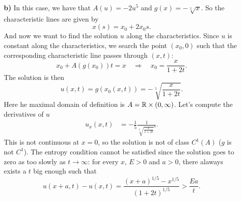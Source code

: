 \begin{enumerate}
    \item[\textbf{b)}]
          In this case, we have that \(A(u) = -2u^5\) and \(g(x) = -\sqrt[5]{x}\). So the characteristic lines are given by
          \[
              x(s) = x_0 + 2 x_0 s.
          \]
          And now we want to find the solution \(u\) along the characteristics. Since
          \(u\) is constant along the characteristics, we search the point \((x_0, 0)\)
          such that the corresponding characteristic line passes through \((x, t)\):
          \[
              x_0 + A(g(x_0)) t = x \quad \Rightarrow \quad x_0 = \frac{x}{1+2t}.
          \]
          The solution is then
          \[
              u(x,t) = g(x_0(x,t)) = -\sqrt[5]{\frac{x}{1+2t}}.
          \]
          Here he maximal domain of definition is \(A = \mathbb{R} \times (0, \infty)\). Let's
          compute the derivatives of \(u\)
          \begin{align*}
              u_x(x,t) & = -\frac{1}{5} \frac{1}{\sqrt[5]{\frac{x}{1+2t}}^4}.
          \end{align*}
          This is not continuous at \(x=0\), so the solution is not of class \(C^1(A)\) ($g$ is not $C^1$).
          The entropy condition cannot be satisfied since the solution goes to zero as too slowly as \(t \to \infty\):
          for every $x$, $E>0$ and $a > 0$, there alaways exists a $t$ big enough such that
          \[
              u(x+a,t) - u(x,t) = \frac{(x+a)^{1/5}-x^{1/5}}{(1+2t)^{1/5}} > \frac{Ea}{t}.
          \]
\end{enumerate}


